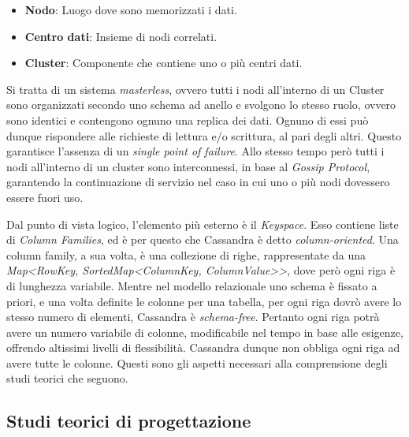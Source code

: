 		\begin{itemize}
			\item \textbf{Nodo}: Luogo dove sono memorizzati i dati.
			\item \textbf{Centro dati}: Insieme di nodi correlati.
			\item \textbf{Cluster}: Componente che contiene uno o più centri dati.
		\end{itemize}
	
		Si tratta di un sistema \textit{masterless}, ovvero tutti i nodi all'interno di un Cluster sono organizzati secondo uno schema ad anello e svolgono lo stesso ruolo, ovvero sono identici e contengono ognuno una replica dei dati. Ognuno di essi può dunque rispondere alle richieste di lettura e/o scrittura, al pari degli altri. Questo garantisce l'assenza di un \textit{single point of failure}. Allo stesso tempo però tutti i nodi all'interno di un cluster sono interconnessi, in base al \textit{Gossip Protocol}, garantendo la continuazione di servizio nel caso in cui uno o più nodi dovessero essere fuori uso.
		
		Dal punto di vista logico, l'elemento più esterno è il \textit{Keyspace}. Esso contiene liste di \textit{Column Families}, ed è per questo che Cassandra è detto \textit{column-oriented}. Una column family, a sua volta, è una collezione di righe, rappresentate da una \textit{Map<RowKey, SortedMap<ColumnKey, ColumnValue>>}, dove però ogni riga è di lunghezza variabile. Mentre nel modello relazionale uno schema è fissato a priori, e una volta definite le colonne per una tabella, per ogni riga dovrò avere lo stesso numero di elementi, Cassandra è \textit{schema-free}. Pertanto ogni riga potrà avere un numero variabile di colonne, modificabile nel tempo in base alle esigenze, offrendo altissimi livelli di flessibilità. Cassandra dunque non obbliga ogni riga ad avere tutte le colonne. 
		Questi sono gli aspetti necessari alla comprensione degli studi teorici che seguono.
				
	\subsection{Studi teorici di progettazione}
		

